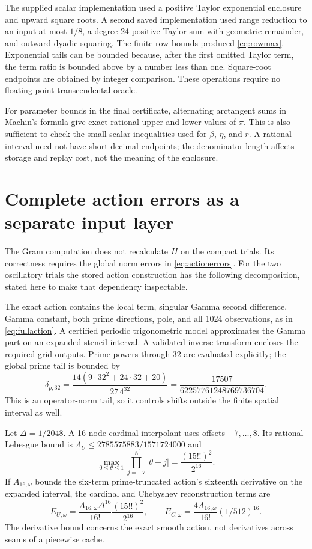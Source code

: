\documentclass[11pt,a4paper]{article}
\numberwithin{equation}{section}
\theoremstyle{definition}\newtheorem{definition}[theorem]{Definition}
\theoremstyle{remark}\newtheorem{remark}[theorem]{Remark}
\begin{document}
The supplied scalar implementation used a positive Taylor exponential enclosure and upward square roots. A second saved implementation used range reduction to an input at most $1/8$, a degree-24 positive Taylor sum with geometric remainder, and outward dyadic squaring. The finite row bounds produced \eqref{eq:rowmax}. Exponential tails can be bounded because, after the first omitted Taylor term, the term ratio is bounded above by a number less than one. Square-root endpoints are obtained by integer comparison. These operations require no floating-point transcendental oracle.

For parameter bounds in the final certificate, alternating arctangent sums in Machin's formula give exact rational upper and lower values of $\pi$. This is also sufficient to check the small scalar inequalities used for $\beta$, $\eta$, and $r$. A rational interval need not have short decimal endpoints; the denominator length affects storage and replay cost, not the meaning of the enclosure.

\section{Complete action errors as a separate input layer}\label{app:actions}
The Gram computation does not recalculate $H$ on the compact trials. Its correctness requires the global norm errors in \eqref{eq:actionerrors}. For the two oscillatory trials the stored action construction has the following decomposition, stated here to make that dependency inspectable.

The exact action contains the local term, singular Gamma second difference, Gamma constant, both prime directions, pole, and all 1024 observations, as in \eqref{eq:fullaction}. A certified periodic trigonometric model approximates the Gamma part on an expanded stencil interval. A validated inverse transform encloses the required grid outputs. Prime powers through 32 are evaluated explicitly; the global prime tail is bounded by
\begin{equation}
 \delta_{p,32}=\frac{14(9\cdot32^2+24\cdot32+20)}{27\,4^{32}}
 =\frac{17507}{62257761248769736704}.
\end{equation}
This is an operator-norm tail, so it controls shifts outside the finite spatial interval as well.

Let $\Delta=1/2048$. A 16-node cardinal interpolant uses offsets $-7,\ldots,8$. Its rational Lebesgue bound is
$\Lambda_U\le2785575883/1571724000$ and
\[
 \max_{0\le\theta\le1}\prod_{j=-7}^{8}|\theta-j|
 =\frac{(15!!)^2}{2^{16}}.
\]
If $A_{16,\omega}$ bounds the six-term prime-truncated action's sixteenth derivative on the expanded interval, the cardinal and Chebyshev reconstruction terms are
\begin{equation}
 E_{U,\omega}=\frac{A_{16,\omega}\Delta^{16}}{16!}\frac{(15!!)^2}{2^{16}},
 \qquad E_{C,\omega}=\frac{4A_{16,\omega}}{16!}(1/512)^{16}.
\end{equation}
The derivative bound concerns the exact smooth action, not derivatives across seams of a piecewise cache.
\end{document}
